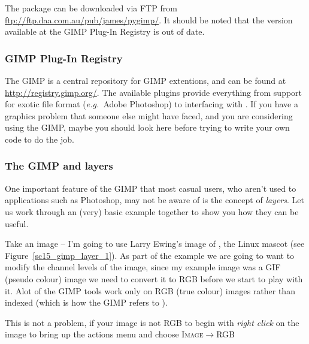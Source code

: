 \documentclass[twoside,11pt]{starlink}
\begin{document}
The package can be downloaded via FTP from \url{ftp://ftp.daa.com.au/pub/james/pygimp/}.
It should be noted that the version available at the GIMP Plug-In
Registry is out of date.

\subsubsection{GIMP Plug-In Registry}

The GIMP  is a central repository for GIMP
extentions, and can be found at \url{http://registry.gimp.org/}. The available plugins provide everything
from support for exotic file format (\emph{e.g.\ }Adobe Photoshop) to
interfacing with . If you have a graphics
problem that someone else might have faced, and you are considering
using the GIMP, maybe you should look here before trying to write your
own code to do the job.

\subsubsection{The GIMP and layers}

One important feature of the GIMP that most casual users, who aren't
used to applications such as Photoshop, may not be aware of is the
concept of \emph{layers}. Let us work through an (very) basic example
together to show you how they can be useful.

Take an image -- I'm going to use Larry Ewing's image of
, the
Linux mascot (see Figure~\ref{sc15_gimp_layer_1}). As part of the
example we are going to want to modify the channel levels of the
image, since my example image was a GIF (pseudo colour) image we need
to convert it to RGB before we start to play with it. Alot of the GIMP
tools work only on RGB (true colour) images rather than indexed (which
is how the GIMP refers to ).

This is not a problem, if your image is not RGB to begin with \emph{right click} on the image to bring up the actions menu and choose \textsc{Image}$\rightarrow$\textsc{RGB}

\end{document}
